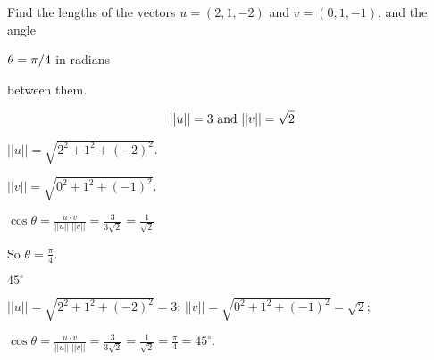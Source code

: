 \documentclass{ximera}
\begin{document}
\begin{exercise} \label{c1.4.3}
Find the lengths of the vectors $u=(2,1,-2)$ and $v=(0,1,-1)$,
and the angle \begin{prompt}$\theta = {\pi/4}$ in radians\end{prompt} between them.
\begin{prompt}
  \[
    ||u|| = {3} \mbox{ and } ||v|| = {\sqrt{2}}
  \]
\end{prompt}
\begin{hint}
  $||u||  =  \sqrt{2^2 + 1^2 + (-2)^2}$.
\end{hint}
\begin{hint}
$||v||  =  \sqrt{0^2 + 1^2 + (-1)^2}$.
\end{hint}
\begin{hint}
$\cos \theta = \frac{u \cdot v}{||u||\;||v||}  =  \frac{3}{3\sqrt{2}} =
\frac{1}{\sqrt{2}}$
\end{hint}
\begin{hint}
So $\theta = \frac{\pi}{4}$.
\end{hint}

\begin{solution}
\ans $45^\circ$

\soln
$||u||  =  \sqrt{2^2 + 1^2 + (-2)^2}  =  3$;
$||v||  =  \sqrt{0^2 + 1^2 + (-1)^2}  =  \sqrt{2}$;

$
\cos \theta = \frac{u \cdot v}{||u||\;||v||}  =  \frac{3}{3\sqrt{2}} =
\frac{1}{\sqrt{2}} = \frac{\pi}{4} = 45^\circ.
$

\end{solution}
\end{exercise}
\end{document}
